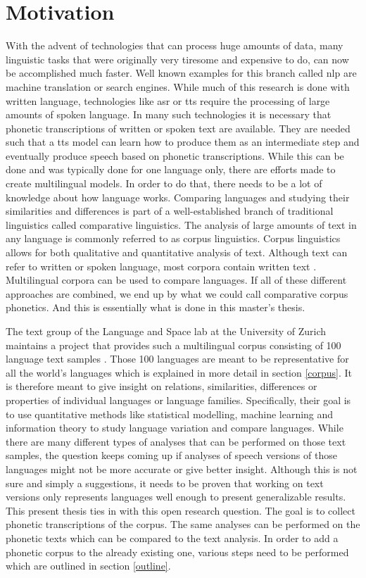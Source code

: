 
\label{chap:1_intro}
\section{Motivation}
With the advent of technologies that can process huge amounts of data, many linguistic tasks that were originally very tiresome and expensive to do, can now be accomplished much faster. Well known examples for this branch called \ac{nlp} are machine translation or search engines. While much of this research is done with written language, technologies like \ac{asr} or \ac{tts} require the processing of large amounts of spoken language. In many such technologies it is necessary that phonetic transcriptions of written or spoken text are available. They are needed such that a \ac{tts} model can learn how to produce them as an intermediate step and eventually produce speech based on phonetic transcriptions. While this can be done and was typically done for one language only, there are efforts made to create multilingual models. In order to do that, there needs to be a lot of knowledge about how language works. Comparing languages and studying their similarities and differences is part of a well-established branch of traditional linguistics called comparative linguistics. The analysis of large amounts of text in any language is commonly referred to as corpus linguistics. Corpus linguistics allows for both qualitative and quantitative analysis of text. Although text can refer to written or spoken language, most corpora contain written text \citep{McEnery&Hardie.2011}. Multilingual corpora can be used to compare languages. If all of these different approaches are combined, we end up by what we could call comparative corpus phonetics. And this is essentially what is done in this master's thesis. 

The text group of the Language and Space lab at the University of Zurich maintains a project that provides such a multilingual corpus consisting of 100 language text samples \citep{UniversityofZurich.19.07.2021}. Those 100 languages are meant to be representative for all the world's languages which is explained in more detail in section \ref{corpus}. It is therefore meant to give insight on relations, similarities, differences or properties of individual languages or language families. Specifically, their goal is to use quantitative methods like statistical modelling, machine learning and information theory to study language variation and compare languages. While there are many different types of analyses that can be performed on those text samples, the question keeps coming up if analyses of speech versions of those languages might not be more accurate or give better insight. Although this is not sure and simply a suggestions, it needs to be proven that working on text versions only represents languages well enough to present generalizable results. This present thesis ties in with this open research question. The goal is to collect phonetic transcriptions of the corpus. The same analyses can be performed on the phonetic texts which can be compared to the text analysis. In order to add a phonetic corpus to the already existing one, various steps need to be performed which are outlined in section \ref{outline}.

